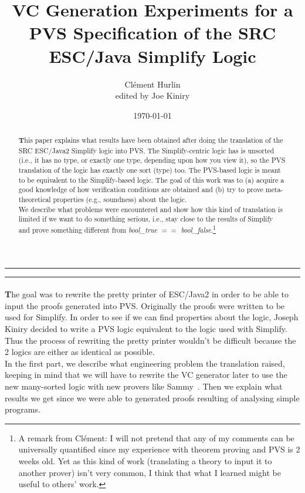 \documentclass[english,a4paper,10pt]{article}
\title{\textbf{VC Generation Experiments for a PVS Specification of
    the SRC ESC/Java Simplify Logic}}
\author{Cl{\'{e}}ment Hurlin\\
edited by Joe Kiniry}
\date{\today}
\newcommand{\superParachute}[1]{\paragraph{}\textbf{#1}}
\newcommand{\BalleSousLeLit}[2]{
\bigskip
\bigskip
\begin{Large}\textbf{\begin{LARGE}#1\end{LARGE}#2}\end{Large}
}
\begin{document}
\maketitle

\thispagestyle{empty} %

\bigskip
\hrule

\begin{abstract}
  \textbf{T}his paper explains what results have been obtained after
  doing the translation of the SRC ESC/Java2 Simplify logic into PVS.
  The Simplify-centric logic has is unsorted (i.e., it has no type, or
  exactly one type, depending upon how you view it), so the PVS
  translation of the logic has exactly one sort (type) too. The
  PVS-based logic is meant to be equivalent to the Simplify-based logic.
  The goal of this work was to (a) acquire a good knowledge of how
  verification conditions are obtained and (b) try to prove
  meta-theoretical properties (e.g., soundness) about the logic.\\

  We describe what problems were encountered and show how this kind of
  translation is limited if we want to do something serious, i.e.,
  stay close to the results of Simplify and prove something different
  from \textit{bool\_true $==$ bool\_false}.\footnote{A remark from
    Cl{\'{e}}ment: I will not pretend that any of my comments can be
    universally quantified since my experience with theorem proving
    and PVS is 2 weeks old. Yet as this kind of work (translating a
    theory to input it to another prover) isn't very common, I think
    that what I learned might be useful to others' work.}
\end{abstract}
\bigskip
\hrule

\BalleSousLeLit{I}{ntroduction}

\superParachute{T}he goal was to rewrite the pretty printer of
ESC/Java2 in order to be able to input the proofs generated into
PVS. Originally the proofs were written to be used for Simplify. In
order to see if we can find properties about the logic, Joseph Kiniry
decided to write a PVS logic equivalent to the logic used with
Simplify.  Thus the process of rewriting the pretty printer wouldn't be
difficult because the 2 logics are either as identical as possible.\\


In the first part, we describe what engineering problem the
translation raised, keeping in mind that we will have to rewrite the
VC generator later to use the new many-sorted logic with new provers
like Sammy~\cite{2}.  Then we explain what results we get since we
were able to generated proofs resulting of analysing simple programs.
\end{document}

